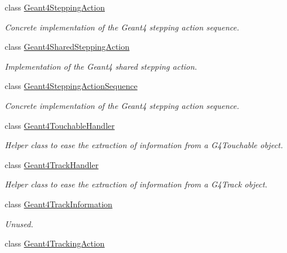 \begin{DoxyCompactItemize}
class \hyperlink{class_d_d4hep_1_1_simulation_1_1_geant4_stepping_action}{Geant4SteppingAction}
\begin{DoxyCompactList}\small\item\em Concrete implementation of the Geant4 stepping action sequence. \item\end{DoxyCompactList}\item 
class \hyperlink{class_d_d4hep_1_1_simulation_1_1_geant4_shared_stepping_action}{Geant4SharedSteppingAction}
\begin{DoxyCompactList}\small\item\em Implementation of the Geant4 shared stepping action. \item\end{DoxyCompactList}\item 
class \hyperlink{class_d_d4hep_1_1_simulation_1_1_geant4_stepping_action_sequence}{Geant4SteppingActionSequence}
\begin{DoxyCompactList}\small\item\em Concrete implementation of the Geant4 stepping action sequence. \item\end{DoxyCompactList}\item 
class \hyperlink{class_d_d4hep_1_1_simulation_1_1_geant4_touchable_handler}{Geant4TouchableHandler}
\begin{DoxyCompactList}\small\item\em Helper class to ease the extraction of information from a G4Touchable object. \item\end{DoxyCompactList}\item 
class \hyperlink{class_d_d4hep_1_1_simulation_1_1_geant4_track_handler}{Geant4TrackHandler}
\begin{DoxyCompactList}\small\item\em Helper class to ease the extraction of information from a G4Track object. \item\end{DoxyCompactList}\item 
class \hyperlink{class_d_d4hep_1_1_simulation_1_1_geant4_track_information}{Geant4TrackInformation}
\begin{DoxyCompactList}\small\item\em Unused. \item\end{DoxyCompactList}\item 
class \hyperlink{class_d_d4hep_1_1_simulation_1_1_geant4_tracking_action}{Geant4TrackingAction}

\end{DoxyCompactItemize}
